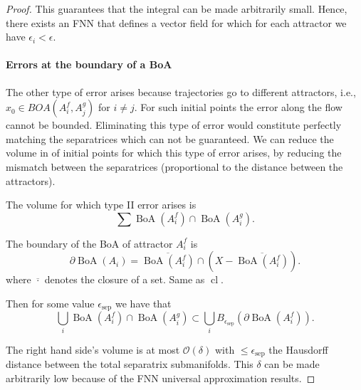 \documentclass{article}
\theoremstyle{definition}
\theoremstyle{remark}
\newcommand{\cl}{\operatorname{cl}}
\newcommand{\boa}{\operatorname{BoA}}
\newcounter{ct}
\begin{document}
\begin{proof}
This guarantees that the integral can be made arbitrarily small.	
Hence, there exists an FNN that defines a vector field for which for each attractor we have $\epsilon_i<\epsilon$. 






\paragraph{Errors at the boundary of a BoA}%
The other type of error arises because trajectories go to different attractors, i.e., $x_0\in BOA(A_i^f,A_j^g)$ for $i\neq j$.
For such initial points the error along the flow cannot be bounded.
Eliminating this type of error would constitute perfectly matching the separatrices which can not be guaranteed.
We can reduce the volume in of initial points for which this type of error arises, by reducing the mismatch between the separatrices (proportional to the distance between the attractors).

The volume for which type II error arises is 
\[\sum\boa(A_i^f)\cap\boa(A_i^g).\]

The boundary of the BoA of attractor $A_i^f$ is %
\[\partial\boa(A_i) = \overline{\boa(A_i^f)} \cap (X - \overline{\boa(A_i^f)}).\]
where \(\overline{\cdot}\) denotes the closure of a set. Same as \(\cl\).

Then for some value $\epsilon_{\operatorname{sep}}$ we have that 
\begin{equation}\label{eq:separatrixoverlap}
\bigcup_i \boa(A_i^f)\cap\boa(A_i^g) \subset \bigcup_i B_{\epsilon_{\operatorname{sep}}}(\partial\boa(A_i^f)). 
\end{equation}

The right hand side's volume is at most $\mathcal{O}(\delta)$ with $\leq\epsilon_{\operatorname{sep}}$ the Hausdorff distance between the total separatrix submanifolds.
This $\delta$ can be made arbitrarily low because of the FNN universal approximation results.


\end{proof}
\end{document}
